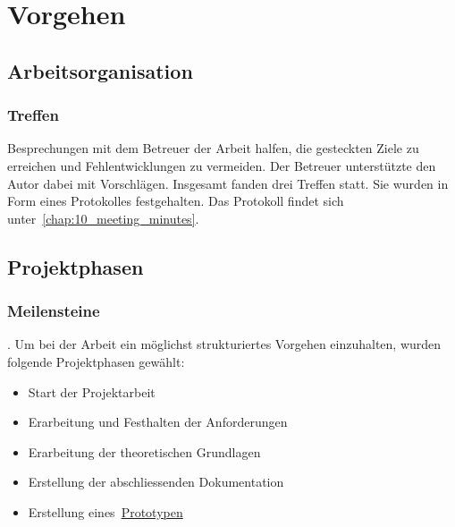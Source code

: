 
\chapter{Vorgehen}
\label{chap:procedure}

\section{Arbeitsorganisation}
\label{sec:organization}

\subsection{Treffen}
\label{subsec:meetings}

Besprechungen mit dem Betreuer der Arbeit halfen, die gesteckten Ziele zu
erreichen und Fehlentwicklungen zu vermeiden. Der Betreuer unterstützte den
Autor dabei mit Vorschlägen. Insgesamt fanden drei Treffen statt. Sie wurden in
Form eines Protokolles festgehalten. Das Protokoll findet sich
unter~\autoref{chap:10_meeting_minutes}.

\section{Projektphasen}
\label{sec:project_schedule}

\subsection{Meilensteine}
\label{subsec:milestones}

.
Um bei der Arbeit ein möglichst strukturiertes Vorgehen einzuhalten,
wurden folgende Projektphasen gewählt:
\begin{itemize}
    \item Start der Projektarbeit
    \item Erarbeitung und Festhalten der Anforderungen
    \item Erarbeitung der theoretischen Grundlagen
    \item Erstellung der abschliessenden Dokumentation
    \item Erstellung eines~\hyperref[chap:prototype]{Prototypen}
\end{itemize}

